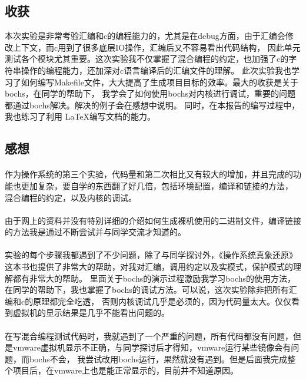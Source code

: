 \documentclass[a4paper, 11pt]{article} %
\begin{document}
\subsection{收获}

本次实验是非常考验汇编和c的编程能力的，尤其是在debug方面，由于汇编会修改上下文，而c用到了很多底层IO操作，汇编后又不容易看出代码结构，
因此单元测试各个模块尤其重要。这次实验我不仅掌握了混合编程的约定，也加强了c的字符串操作的编程能力，还加深对c语言编译后的汇编文件的理解。
此次实验我也学习了如何编写Makefile文件\cite{makefile}，大大提高了生成项目目标的效率。最大的收获是关于bochs，在同学的帮助下，
我学会了如何使用bochs对内核进行调试，重要的问题都通过bochs解决。解决的例子会在感想中说明。
同时，在本报告的编写过程中，我也练习了利用 \LaTeX 编写文档的能力。\cite{lamport94, cite}

\subsection{感想}
\paragraph{}
作为操作系统的第三个实验，代码量和第二次相比又有较大的增加，并且完成的功能也更加复杂，要自学的东西翻了好几倍，包括环境配置，编译和链接的方法，
混合编程的约定，以及内核的调试。
\paragraph{}
由于网上的资料并没有特别详细的介绍如何生成裸机使用的二进制文件，编译链接的方法我是通过不断尝试并与同学交流才知道的。
\paragraph{}
实验的每个步骤我都遇到了不少问题，除了与同学探讨外，《操作系统真象还原》\cite{realmodedownside}这本书也提供了非常大的帮助，对我对汇编，调用约定以及实模式，保护模式的理解都有非常大的帮助。
里面关于bochs的演示过程激励我学习bochs的使用方法，在同学的帮助下，我也掌握了bochs的调试方法。可以说，这次实验除非把所有汇编和c的原理都完全吃透，
否则内核调试几乎是必须的，因为代码量太大。仅仅看到虚拟机的显示结果是几乎不能看出问题的。
\paragraph{}
在写混合编程测试代码时，我就遇到了一个严重的问题，所有代码都没有问题，但是vmware虚拟机显示不正确，与同学探讨后才得知，vmware运行某些镜像会有问题，而bochs不会，
我尝试改用bochs运行，果然就没有遇到。但是后面我完成整个项目后，在vmware上也是能正常显示的，目前并不知道原因。
\end{document}
